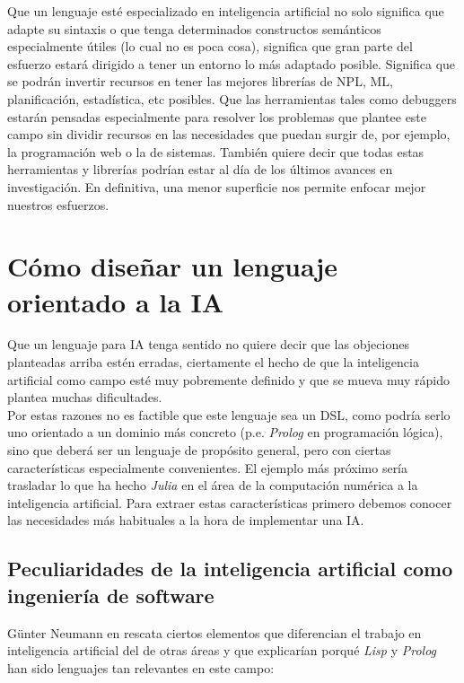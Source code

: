 Que un lenguaje esté especializado en inteligencia artificial no solo significa que adapte su sintaxis o que tenga determinados constructos semánticos especialmente útiles (lo cual no es poca cosa), significa que gran parte del esfuerzo estará dirigido a tener un entorno lo más adaptado posible. Significa que se podrán invertir recursos en tener las mejores librerías de NPL, ML, planificación, estadística, etc posibles. Que las herramientas tales como debuggers estarán pensadas especialmente para resolver los problemas que plantee este campo sin dividir recursos en las necesidades que puedan surgir de, por ejemplo, la programación web o la de sistemas. También quiere decir que todas estas herramientas y librerías podrían estar al día de los últimos avances en investigación. En definitiva, una menor superficie nos permite enfocar mejor nuestros esfuerzos.\\


\section{Cómo diseñar un lenguaje orientado a la IA}
Que un lenguaje para IA tenga sentido no quiere decir que las objeciones planteadas arriba estén erradas, ciertamente el hecho de que la inteligencia artificial como campo esté muy pobremente definido y que se mueva muy rápido plantea muchas dificultades.\\

Por estas razones no es factible que este lenguaje sea un \acs{DSL}, como podría serlo uno orientado a un dominio más concreto (p.e. \textit{Prolog} en programación lógica), sino que deberá ser un lenguaje de propósito general, pero con ciertas características especialmente convenientes.
El ejemplo más próximo sería trasladar lo que ha hecho \textit{Julia} en el área de la computación numérica a la inteligencia artificial.
Para extraer estas características primero debemos conocer las necesidades más habituales a la hora de implementar una IA.\\

\subsection{Peculiaridades de la inteligencia artificial como ingeniería de software}
Günter Neumann en \cite{neumann_programming_nodate} rescata ciertos elementos que diferencian el trabajo en inteligencia artificial del de otras áreas y que explicarían porqué \textit{Lisp} y \textit{Prolog} han sido lenguajes tan relevantes en este campo:\\

